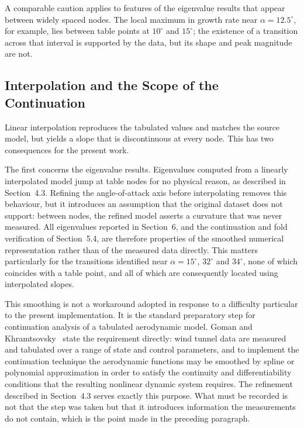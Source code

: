 \documentclass[
bindingoffset=5mm,  %
footnoteindent=3mm, %
hyphenation=true    %
]{src/wut-thesis}
\begin{document}
 A comparable caution applies to features of the eigenvalue results that appear
 between widely spaced nodes. The local maximum in growth rate near
 $\alpha = 12.5^{\circ}$, for example, lies between table points at
 $10^{\circ}$ and $15^{\circ}$; the existence of a transition across that
 interval is supported by the data, but its shape and peak magnitude are not.
 
 
 
 \subsection{Interpolation and the Scope of the Continuation}
 
 Linear interpolation reproduces the tabulated values and matches the source
 model, but yields a slope that is discontinuous at every node. This has two
 consequences for the present work.
 
 The first concerns the eigenvalue results. Eigenvalues computed from a
 linearly interpolated model jump at table nodes for no physical reason, as
 described in Section~4.3. Refining the angle-of-attack axis before
 interpolating removes this behaviour, but it introduces an assumption that the
 original dataset does not support: between nodes, the refined model asserts a
 curvature that was never measured. All eigenvalues reported in Section~6, and
 the continuation and fold verification of Section~5.4, are therefore
 properties of the smoothed numerical representation rather than of the
 measured data directly. This matters particularly for the transitions
 identified near $\alpha = 15^{\circ}$, $32^{\circ}$ and $34^{\circ}$, none of
 which coincides with a table point, and all of which are consequently located
 using interpolated slopes.
 
 This smoothing is not a workaround adopted in response to a difficulty
 particular to the present implementation. It is the standard preparatory step
 for continuation analysis of a tabulated aerodynamic model. Goman and
 Khramtsovsky~\cite{goman1998} state the requirement directly: wind tunnel data
 are measured and tabulated over a range of state and control parameters, and
 to implement the continuation technique the aerodynamic functions may be
 smoothed by spline or polynomial approximation in order to satisfy the
 continuity and differentiability conditions that the resulting nonlinear
 dynamic system requires. The refinement described in Section~4.3 serves
 exactly this purpose. What must be recorded is not that the step was taken but
 that it introduces information the measurements do not contain, which is the
 point made in the preceding paragraph.
 
\end{document}

